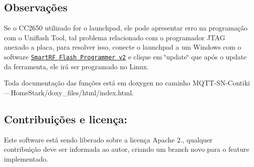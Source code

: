 \subsection*{Observações}


\begin{DoxyEnumerate}
\item Se o C\+C2650 utilizado for o launchpad, ele pode apresentar erro na programação com o Uniflash Tool, tal problema relacionado com o programador J\+T\+A\+G anexado a placa, para resolver isso, conecte o launchpad a um Windows com o software \href{http://software-dl.ti.com/dsps/forms/self_cert_export.html?prod_no=flash-programmer-2-1.7.4.zip&ref_url=http://software-dl.ti.com/lprf/flash_programmer_2}{\tt Smart\+R\+F Flash Programmer v2} e clique em \char`\"{}update\char`\"{} que após o update da ferramenta, ele irá ser programado no Linux.
\item Toda documentação das funções está em doxygen no caminho M\+Q\+T\+T-\/\+S\+N-\/\+Contiki---Home\+Stark/doxy\+\_\+files/html/index.\+html.
\end{DoxyEnumerate}

\subsection*{Contribuições e licença\+:}

Este software está sendo liberado sobre a licença Apache 2., qualquer contribuição deve ser informada ao autor, criando um branch novo para o feature implementado. 